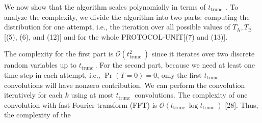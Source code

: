 \documentclass[10pt]{article}
\begin{document}
We now show that the algorithm scales polynomially in terms of $t_{\text {trunc. }}$. To analyze the complexity, we divide the algorithm into two parts: computing the distribution for one attempt, i.e., the iteration over all possible values of $T_{\mathrm{A}}, T_{\mathrm{B}}$ [(5), (6), and (12)] and for the whole PROTOCOL-UNIT[(7) and (13)].

The complexity for the first part is $\mathcal{O}\left(t_{\text {trunc }}^{2}\right)$ since it iterates over two discrete random variables up to $t_{\text {trunc }}$. For the second part, because we need at least one time step in each attempt, i.e., $\operatorname{Pr}(T=0)=0$, only the first $t_{\text {trunc }}$ convolutions will have nonzero contribution. We can perform the convolution iteratively for each $k$ using at most $t_{\text {trunc }}$ convolutions. The complexity of one convolution with fast Fourier transform (FFT) is $\mathcal{O}\left(t_{\text {trunc }} \log t_{\text {trunc }}\right)$ [28]. Thus, the complexity of the
\end{document}
